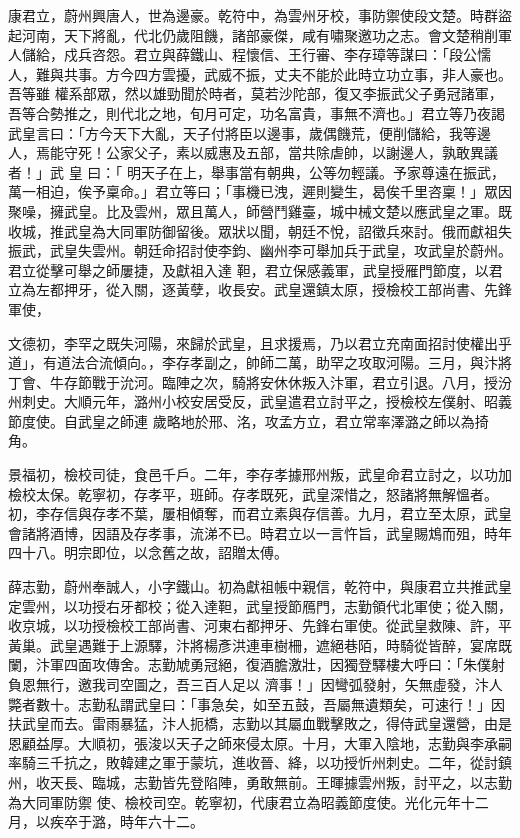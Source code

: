 
\begin{pinyinscope}

 康君立，蔚州興唐人，世為邊豪。乾符中，為雲州牙校，事防禦使段文楚。時群盜起河南，天下將亂，代北仍歲阻饑，諸部豪傑，咸有嘯聚邀功之志。會文楚稍削軍人儲給，戍兵咨怨。君立與薛鐵山、程懷信、王行審、李存璋等謀曰：「段公懦人，難與共事。方今四方雲擾，武威不振，丈夫不能於此時立功立事，非人豪也。吾等雖
 權系部眾，然以雄勁聞於時者，莫若沙陀部，復又李振武父子勇冠諸軍，吾等合勢推之，則代北之地，旬月可定，功名富貴，事無不濟也。」君立等乃夜謁武皇言曰：「方今天下大亂，天子付將臣以邊事，歲偶饑荒，便削儲給，我等邊人，焉能守死！公家父子，素以威惠及五部，當共除虐帥，以謝邊人，孰敢異議者！」武
 皇
 曰：「
 明天子在上，舉事當有朝典，公等勿輕議。予家尊遠在振武，萬一相迫，俟予稟命。」君立等曰；「事機已洩，遲則變生，曷俟千里咨稟！」眾因聚噪，擁武皇。比及雲州，眾且萬人，師營鬥雞臺，城中械文楚以應武皇之軍。既收城，推武皇為大同軍防御留後。眾狀以聞，朝廷不悅，詔徵兵來討。俄而獻祖失振武，武皇失雲州。朝廷命招討使李鈞、幽州李可舉加兵于武皇，攻武皇於蔚州。君立從擊可舉之師屢捷，及獻祖入達
 靼，君立保感義軍，武皇授雁門節度，以君立為左都押牙，從入關，逐黃孽，收長安。武皇還鎮太原，授檢校工部尚書、先鋒軍使，



 文德初，李罕之既失河陽，來歸於武皇，且求援焉，乃以君立充南面招討使權出乎道」，有道法合流傾向。，李存孝副之，帥師二萬，助罕之攻取河陽。三月，與汴將丁會、牛存節戰于沇河。臨陣之次，騎將安休休叛入汴軍，君立引退。八月，授汾州刺史。大順元年，潞州小校安居受反，武皇遣君立討平之，授檢校左僕射、昭義節度使。自武皇之師連
 歲略地於邢、洺，攻孟方立，君立常率澤潞之師以為掎角。



 景福初，檢校司徒，食邑千戶。二年，李存孝據邢州叛，武皇命君立討之，以功加檢校太保。乾寧初，存孝平，班師。存孝既死，武皇深惜之，怒諸將無解慍者。初，李存信與存孝不葉，屢相傾奪，而君立素與存信善。九月，君立至太原，武皇會諸將酒博，因語及存孝事，流涕不已。時君立以一言忤旨，武皇賜鴆而殂，時年四十八。明宗即位，以念舊之故，詔贈太傅。



 薛志勤，蔚州奉誠人，小字鐵山。初為獻祖帳中親信，乾符中，與康君立共推武皇定雲州，以功授右牙都校；從入達靼，武皇授節鴈門，志勤領代北軍使；從入關，收京城，以功授檢校工部尚書、河東右都押牙、先鋒右軍使。從武皇救陳、許，平黃巢。武皇遇難于上源驛，汴將楊彥洪連車樹柵，遮絕巷陌，時騎從皆醉，宴席既闌，汴軍四面攻傳舍。志勤虓勇冠絕，復酒膽激壯，因獨登驛樓大呼曰：「朱僕射負恩無行，邀我司空圖之，吾三百人足以
 濟事！」因彎弧發射，矢無虛發，汴人斃者數十。志勤私謂武皇曰：「事急矣，如至五鼓，吾屬無遺類矣，可速行！」因扶武皇而去。雷雨暴猛，汴人扼橋，志勤以其屬血戰擊敗之，得侍武皇還營，由是恩顧益厚。大順初，張浚以天子之師來侵太原。十月，大軍入陰地，志勤與李承嗣率騎三千抗之，敗韓建之軍于蒙坑，進收晉、絳，以功授忻州刺史。二年，從討鎮州，收天長、臨城，志勤皆先登陷陣，勇敢無前。王暉據雲州叛，討平之，以志勤為大同軍防禦
 使、檢校司空。乾寧初，代康君立為昭義節度使。光化元年十二月，以疾卒于潞，時年六十二。




\end{pinyinscope}
